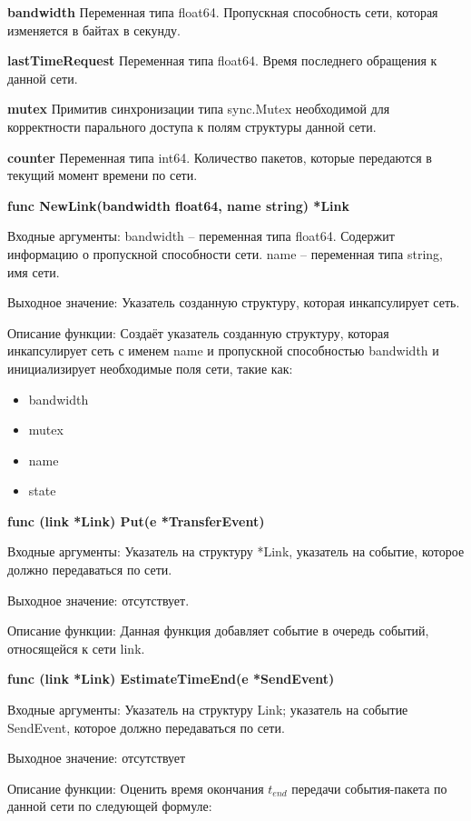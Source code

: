 \textbf{bandwidth}	 
Переменная типа float64. Пропускная способность сети, которая изменяется в байтах в секунду. 

\textbf{lastTimeRequest}
Переменная типа float64. Время последнего обращения к данной сети.

\textbf{mutex}	           
Примитив синхронизации типа sync.Mutex необходимой для корректности парального доступа к полям структуры данной сети.
 
\textbf{counter}
Переменная типа int64. Количество пакетов, которые передаются в текущий момент времени по сети. 


\textbf{func NewLink(bandwidth float64, name string) *Link}

Входные аргументы: bandwidth -- переменная типа float64. Содержит информацию о пропускной способности сети. name -- переменная типа string, имя сети. 

Выходное значение: Указатель созданную структуру, которая инкапсулирует сеть. 

Описание функции: Создаёт указатель созданную структуру, которая инкапсулирует сеть с именем name и пропускной способностью bandwidth и инициализирует необходимые поля сети, такие как:

\begin{itemize}
\item bandwidth 
\item mutex    
\item name   
\item state  
\end{itemize}




\textbf{func (link *Link) Put(e *TransferEvent)}

Входные аргументы: Указатель на структуру *Link, указатель на событие, которое должно передаваться по сети.

Выходное значение: отсутствует.

Описание функции: Данная функция добавляет событие в очередь событий, относящейся к сети link. 


\textbf{func (link *Link) EstimateTimeEnd(e *SendEvent)}

Входные аргументы: Указатель на структуру Link; указатель на событие SendEvent, которое должно передаваться по сети.

Выходное значение: отсутствует

Описание функции: Оценить время окончания  $t_{end}$ передачи события-пакета по данной сети по следующей формуле:

